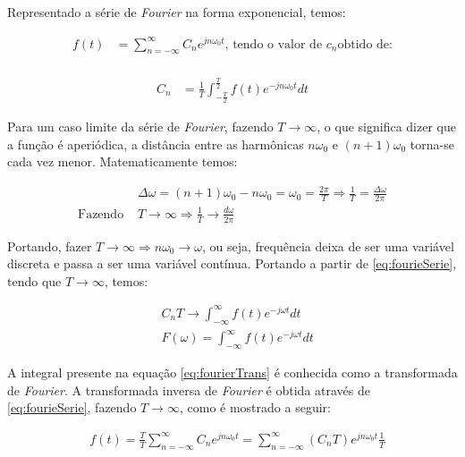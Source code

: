 \documentclass[monografia]{subfiles}
\begin{document}
		Representado a série de \textit{Fourier} na forma exponencial, temos:

			\begin{align}
			\label{eq:fourieSerie}
				f(t) & = \sum_{n=-\infty}^{\infty}C_{n} e^{j n \omega_{0} t} \textrm{, tendo o valor de } c_{n} \textrm{obtido de:}\\
			\end{align}

			\begin{align}
			\label{eq:fourieSerieC}
				C_{n} &= \frac{1}{T} \int_{  -\frac{T}{2}   }^{\frac{T}{2}}f(t) e^{-j n \omega_{0} t}dt
			\end{align}

			Para um caso limite da série de \textit{Fourier}, fazendo $T \rightarrow \infty$, o que significa dizer que a função é aperiódica, a distância
			entre as harmônicas $n\omega_{0}$ e $(n+1)\omega_{0}$ torna-se cada vez menor. Matematicamente temos:

			\begin{align}
				& \Delta \omega = (n+1)\omega_{0} - n\omega_{0} = \omega_{0} = \frac{2\pi}{T} \Rightarrow 
				\frac{1}{T} = \frac{\Delta \omega}{2 \pi}\\
				\textrm{Fazendo } & T \rightarrow \infty \Rightarrow \frac{1}{T} \rightarrow  \frac{d\omega}{2 \pi} 
			\end{align}

			Portando, fazer $T \rightarrow \infty \Rightarrow n\omega_{0}\rightarrow \omega$,
			ou seja, frequência deixa de ser uma variável discreta e passa a ser uma variável contínua. Portando a partir de \ref{eq:fourieSerie}, 
			tendo que $T \rightarrow \infty$, temos:

			\begin{align}
				\label{eq:fourierTrans}
				&C_{n}T \rightarrow \int_{-\infty}^{\infty}f(t)e^{-j \omega t}dt \\
				&F(\omega) = \int_{-\infty}^{\infty}f(t)e^{-j \omega t}dt  
			\end{align}

				A integral presente na equação \ref{eq:fourierTrans} é conhecida como a transformada de \textit{Fourier}. A transformada inversa de \textit{Fourier}
				é obtida através de \ref{eq:fourieSerie}, fazendo $T \rightarrow \infty$, como é mostrado a seguir:

			\begin{align}
				&f(t) = \frac{T}{T} \sum_{n=-\infty}^{\infty}C_{n} e^{j n \omega_{0} t} = \sum_{n=-\infty}^{\infty}(C_{n}T) e^{j n \omega_{0} t} \frac{1}{T}\\
			\end{align}
				
\end{document}
